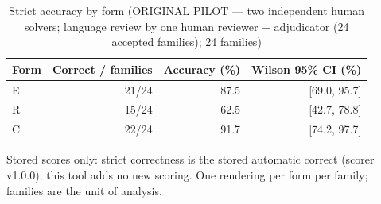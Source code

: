 \begin{table}[t]
\centering
\small
\caption{Strict accuracy by form (ORIGINAL PILOT --- two independent human solvers; language review by one human reviewer + adjudicator (24 accepted families); 24 families)}
\label{tab:pilotorig-Llama-3.2-3B-Instruct-accuracy}
\begin{tabular}{lrrr}
\toprule
Form & Correct / families & Accuracy (\%) & Wilson 95\% CI (\%) \\
\midrule
E & 21/24 & 87.5 & [69.0, 95.7] \\
R & 15/24 & 62.5 & [42.7, 78.8] \\
C & 22/24 & 91.7 & [74.2, 97.7] \\
\bottomrule
\end{tabular}
\par\smallskip
\parbox{\linewidth}{\footnotesize Stored scores only: strict correctness is the stored automatic correct (scorer v1.0.0); this tool adds no new scoring. One rendering per form per family; families are the unit of analysis.}
\end{table}
